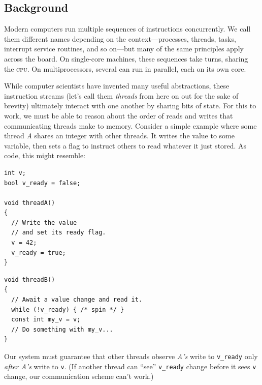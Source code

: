 \documentclass[fontsize=10pt, numbers=endperiod]{scrartcl}
\newcommand{\codesize}{\fontsize{10pt}{12pt}}
\newenvironment{colfigure}
  {\par\vspace{1\baselineskip minus 0.5\baselineskip}\noindent\minipage{\linewidth}}
  {\endminipage\vspace*{1\baselineskip minus 0.7\baselineskip}}
\begin{document}
\begin{multicols*}{2}
\section{Background}
\label{background}

Modern computers run multiple sequences of instructions concurrently.
We call them different names depending on the context---processes, threads, tasks,
interrupt service routines, and so on---but many of the same principles apply
across the board.
On single-core machines, these sequences take turns,
sharing the \textsc{cpu}.
On multiprocessors, several can run in parallel, each on its own core.

While computer scientists have invented many useful abstractions,
these instruction streams (let's call them \emph{threads} from here on out for
the sake of brevity) ultimately interact with one another by sharing bits of state.
For this to work, we must be able to reason about
the order of reads and writes that communicating threads make to memory.
Consider a simple example where some thread \textit{A} shares
an integer with other threads.
It writes the value to some variable,
then sets a flag to instruct others to read whatever it just stored.
As code, this might resemble:
\begin{colfigure}
\begin{verbatim}
int v;
bool v_ready = false;

void threadA()
{
  // Write the value
  // and set its ready flag.
  v = 42;
  v_ready = true;
}
\end{verbatim}
\end{colfigure}
\begin{colfigure}
\begin{verbatim}
void threadB()
{
  // Await a value change and read it.
  while (!v_ready) { /* spin */ }
  const int my_v = v;
  // Do something with my_v...
}
\end{verbatim}
\end{colfigure}
Our system must guarantee that other threads observe \textit{A's} write to
\texttt{v\_ready}
only \emph{after A's} write to \texttt{v}.
(If another thread can ``see'' \texttt{v\_ready} change before it sees \texttt{v}
change, our communication scheme can't work.)


\end{multicols*}
\end{document}

